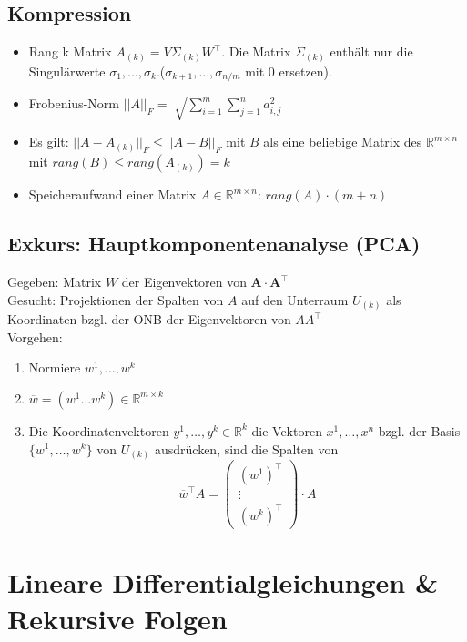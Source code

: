 \documentclass[german, 6pt]{latex4ei/latex4ei_sheet}
\begin{document}
\begin{minipage}{\columnwidth}
\subsection{Kompression}
\begin{itemize}\itemsep0pt
\item Rang k Matrix $A_{(k)}=V\Sigma_{(k)}W^\top$. Die Matrix $\Sigma_{(k)}$ enthält nur die Singulärwerte $\sigma_1, ...,\sigma_k$.\qquad ($\sigma_{k+1}, ...,\sigma_{n/m}$ mit 0 ersetzen).\\
\item Frobenius-Norm $|| A ||_F = \sqrt[]{\sum_{i=1}^{m} \sum_{j=1}^{n} {a^{2}_{i,j}}}$\\
\item Es gilt: $|| A-A_{(k)} ||_F \leq || A-B ||_F$ mit $B$ als eine beliebige Matrix des $\mathbb{R}^{m\times n}$ mit $rang(B) \leq rang(A_{(k)}) = k$
\item Speicheraufwand einer Matrix $A\in \mathbb{R}^{m\times n}$: $rang(A) \cdot (m+n)$
\end{itemize}
\end{minipage}
\subsection{Exkurs: Hauptkomponentenanalyse (PCA)}
Gegeben: Matrix $W$ der Eigenvektoren von $\mathbf{A\cdot A^\top}$\\
Gesucht: Projektionen der Spalten von $A$ auf den Unterraum $U_{(k)}$ als Koordinaten bzgl. der ONB der Eigenvektoren von $AA^\top$\\
Vorgehen: 
\begin{enumerate}
	\item Normiere $w^1, \dots , w^k$
	\item $\overline{w}=(w^1 \dots w^k)\in \mathbb{R}^{m\times k}$
	\item Die Koordinatenvektoren $y^1, \dots , y^k \in \mathbb{R}^{k}$ die Vektoren $x^1,\dots , x^n$ bzgl. der Basis $\{w^1, \dots , w^k\}$ von $U_{(k)}$ ausdrücken, sind die Spalten von \begin{equation*}\overline{w}^\top A=\begin{pmatrix}
	(w^{1})^{\top} \\
	\vdots \\
	(w^{k})^{\top}
	\end{pmatrix}
	\cdot A
	\end{equation*}
\end{enumerate}
\section{Lineare Differentialgleichungen \& Rekursive Folgen}
\end{document}
